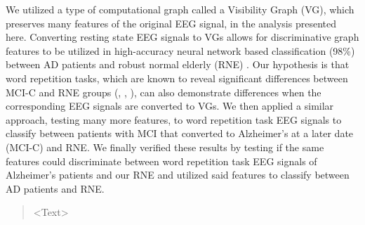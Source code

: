 \documentclass[Afour,times,sageh]{sagej}
\begin{document}
We utilized a type of computational graph called a Visibility Graph (VG), which preserves many features of the original EEG signal, in the analysis presented here. Converting resting state EEG signals to VGs allows for discriminative graph features to be utilized in high-accuracy neural network based classification (98\%) between AD patients and robust normal elderly (RNE) \citep{Ahmadlou2010}. Our hypothesis is that word repetition tasks, which are known to reveal significant differences between MCI-C and RNE groups (\citet{OlichneyN400}, \citet{OlchneyP600}, \citet{TaylorERP}), can also demonstrate differences when the corresponding EEG signals are converted to VGs. We then applied a similar approach, testing many more features, to word repetition task EEG signals to classify between patients with MCI that converted to Alzheimer's at a later date (MCI-C) and RNE. We finally verified these results by testing if the same features could discriminate between word repetition task EEG signals of Alzheimer's patients and our RNE and utilized said features to classify between AD patients and RNE.
\begin{abstract}
<Text>
\end{abstract}


\maketitle
\end{document}
